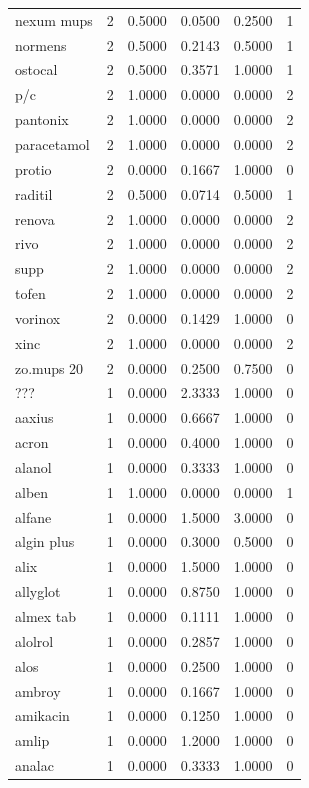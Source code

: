 \begin{longtable}{p{3.0cm}rrrrr}
nexum mups & 2 & 0.5000 & 0.0500 & 0.2500 & 1 \\
normens & 2 & 0.5000 & 0.2143 & 0.5000 & 1 \\
ostocal & 2 & 0.5000 & 0.3571 & 1.0000 & 1 \\
p/c & 2 & 1.0000 & 0.0000 & 0.0000 & 2 \\
pantonix & 2 & 1.0000 & 0.0000 & 0.0000 & 2 \\
paracetamol & 2 & 1.0000 & 0.0000 & 0.0000 & 2 \\
protio & 2 & 0.0000 & 0.1667 & 1.0000 & 0 \\
raditil & 2 & 0.5000 & 0.0714 & 0.5000 & 1 \\
renova & 2 & 1.0000 & 0.0000 & 0.0000 & 2 \\
rivo & 2 & 1.0000 & 0.0000 & 0.0000 & 2 \\
supp & 2 & 1.0000 & 0.0000 & 0.0000 & 2 \\
tofen & 2 & 1.0000 & 0.0000 & 0.0000 & 2 \\
vorinox & 2 & 0.0000 & 0.1429 & 1.0000 & 0 \\
xinc & 2 & 1.0000 & 0.0000 & 0.0000 & 2 \\
zo.mups 20 & 2 & 0.0000 & 0.2500 & 0.7500 & 0 \\
??? & 1 & 0.0000 & 2.3333 & 1.0000 & 0 \\
aaxius & 1 & 0.0000 & 0.6667 & 1.0000 & 0 \\
acron & 1 & 0.0000 & 0.4000 & 1.0000 & 0 \\
alanol & 1 & 0.0000 & 0.3333 & 1.0000 & 0 \\
alben & 1 & 1.0000 & 0.0000 & 0.0000 & 1 \\
alfane & 1 & 0.0000 & 1.5000 & 3.0000 & 0 \\
algin plus & 1 & 0.0000 & 0.3000 & 0.5000 & 0 \\
alix & 1 & 0.0000 & 1.5000 & 1.0000 & 0 \\
allyglot & 1 & 0.0000 & 0.8750 & 1.0000 & 0 \\
almex tab & 1 & 0.0000 & 0.1111 & 1.0000 & 0 \\
alolrol & 1 & 0.0000 & 0.2857 & 1.0000 & 0 \\
alos & 1 & 0.0000 & 0.2500 & 1.0000 & 0 \\
ambroy & 1 & 0.0000 & 0.1667 & 1.0000 & 0 \\
amikacin & 1 & 0.0000 & 0.1250 & 1.0000 & 0 \\
amlip & 1 & 0.0000 & 1.2000 & 1.0000 & 0 \\
analac & 1 & 0.0000 & 0.3333 & 1.0000 & 0 \\

\end{longtable}
